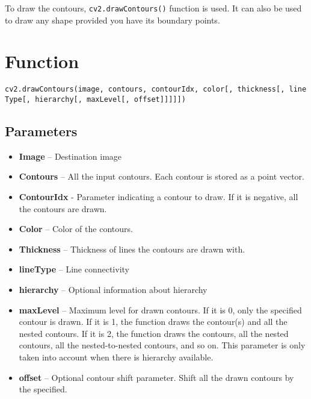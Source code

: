 \documentclass[]{article}
\providecommand{\tightlist}{%
  \setlength{\itemsep}{0pt}\setlength{\parskip}{0pt}}
\begin{document}
To draw the contours, \texttt{cv2.drawContours()} function is used. It
can also be used to draw any shape provided you have its boundary
points.

\section{Function}\label{function-1}

\texttt{cv2.drawContours(image,\ contours,\ contourIdx,\ color{[},\ thickness{[},\ lineType{[},\ hierarchy{[},\ maxLevel{[},\ offset{]}{]}{]}{]}{]})}

\subsection{Parameters}\label{parameters-1}

\begin{itemize}
\tightlist
\item
  \textbf{Image} -- Destination image\\
\item
  \textbf{Contours} -- All the input contours. Each contour is stored as
  a point vector.\\
\item
  \textbf{ContourIdx} - Parameter indicating a contour to draw. If it is
  negative, all the contours are drawn.\\
\item
  \textbf{Color} -- Color of the contours.\\
\item
  \textbf{Thickness} -- Thickness of lines the contours are drawn
  with.\\
\item
  \textbf{lineType} -- Line connectivity\\
\item
  \textbf{hierarchy} -- Optional information about hierarchy\\
\item
  \textbf{maxLevel} -- Maximum level for drawn contours. If it is 0,
  only the specified contour is drawn. If it is 1, the function draws
  the contour(s) and all the nested contours. If it is 2, the function
  draws the contours, all the nested contours, all the nested-to-nested
  contours, and so on. This parameter is only taken into account when
  there is hierarchy available.\\
\item
  \textbf{offset} -- Optional contour shift parameter. Shift all the
  drawn contours by the specified.
\end{itemize}
\end{document}
